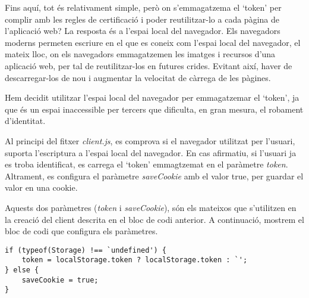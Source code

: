 Fins aquí, tot és relativament simple, però on s'emmagatzema el `token' per complir amb les regles de certificació i poder reutilitzar-lo a cada pàgina de l'aplicació web? La resposta és a l'espai local del navegador. Els navegadors moderns permeten escriure en el que es coneix com l'espai local del navegador, el mateix lloc, on els navegadors emmagatzemen les imatges i recursos d'una aplicació web, per tal de reutilitzar-los en futures crides. Evitant així, haver de descarregar-los de nou i augmentar la velocitat de càrrega de les pàgines.

Hem decidit utilitzar l'espai local del navegador per emmagatzemar el `token', ja que és un espai inaccessible per tercers que dificulta, en gran mesura, el robament d'identitat.

Al principi del fitxer \emph{client.js}, es comprova si el navegador utilitzat per l'usuari, suporta l'escriptura a l'espai local del navegador. En cas afirmatiu, si l'usuari ja es troba identificat, es carrega el `token' emmagtzemat en el paràmetre \emph{token}. Altrament, es configura el paràmetre \emph{saveCookie} amb el valor true, per guardar el valor en una cookie.

Aquests dos paràmetres (\emph{token} i \emph{saveCookie}), són els mateixos que s'utilitzen en la creació del client descrita en el bloc de codi anterior. A continuació, mostrem el bloc de codi que configura els paràmetres.

\begin{lstlisting}[style=rawOwn,caption={Configuració dels paràmetres \emph{access\_test\_token} i \emph{token}}]
if (typeof(Storage) !== `undefined') {
    token = localStorage.token ? localStorage.token : `';
} else {
    saveCookie = true;
}
\end{lstlisting}
